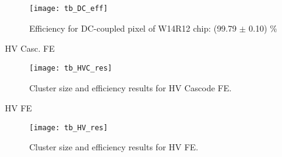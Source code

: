 \begin{figure}[h!]
\centering
\texttt{[image: tb\_DC\_eff]}
\caption{Efficiency for DC-coupled pixel of W14R12 chip: (99.79 $\pm$ 0.10) \%}
\label{fig:tb_DC_Cz}
\end{figure}



\begin{description}
\item[HV Casc. FE]
\end{description}

\begin{figure}[h!]
\centering
\texttt{[image: tb\_HVC\_res]}
\caption{Cluster size and efficiency results for HV Cascode FE.}
\label{fig:tb_HVC}
\end{figure}


\begin{description}
\item[HV FE]
\end{description}

\begin{figure}[h!]
\centering
\texttt{[image: tb\_HV\_res]}
\caption{Cluster size and efficiency results for HV FE.}
\label{fig:tb_HV}
\end{figure}














































